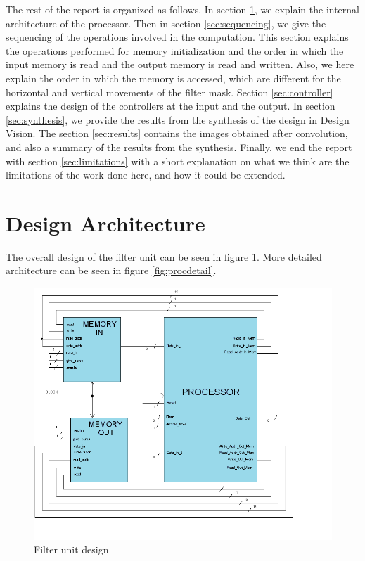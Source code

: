 \documentclass[11pt,a4paper]{article}
\begin{document}
The rest of the report is organized as follows. In section \ref{sec:design}, we explain the internal architecture of the processor. Then in section \ref{sec:sequencing}, we give the sequencing of the operations involved in the computation. This section explains the operations performed for memory initialization and the order in which the input memory is read and the output memory is read and written. Also, we here explain the order in which the memory is accessed, which are different for the horizontal and vertical movements of the filter mask. Section \ref{sec:controller} explains the design of the controllers at the input and the output. In section \ref{sec:synthesis}, we provide the results from the synthesis of the design in Design Vision. The section \ref{sec:results} contains the images obtained after convolution, and also a summary of the results from the synthesis. Finally, we end the report with section \ref{sec:limitations} with a short explanation on what we think are the limitations of the work done here, and how it could be extended.

\section{Design Architecture}
\label{sec:design}
The overall design of the filter unit can be seen in figure \ref{fig:proc}. More detailed architecture can be seen in figure \ref{fig:procdetail}.

\begin{figure}[h]
	\centering
		\includegraphics[width=6in]{./images/processador.PNG}
	\caption{Filter unit design}	\label{fig:proc}
\end{figure}
\end{document}
